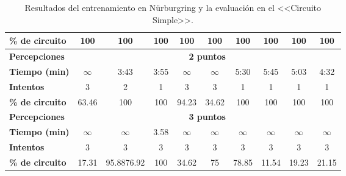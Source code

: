 \begin{table}[ht!]
\begin{tabular}{|l|c|c|c|c|c|c|c|c|c|}
\rowcolor[HTML]{32CB00} 
\cellcolor[HTML]{EFEFEF}\textbf{\% de circuito}   & 100                           & 100        & \textbf{100}                & 100                           & 100                           & 100        & 100                 & 100                & 100                \\ \hline
\rowcolor[HTML]{EFEFEF} 
\textbf{Percepciones}                     & \multicolumn{9}{c|}{\cellcolor[HTML]{EFEFEF}\textbf{2 puntos}}                                                                                                                                                        \\ \hline
\cellcolor[HTML]{EFEFEF}\textbf{Tiempo (min)}          & $\infty$                        & 3:43       & 3:55                        & $\infty$                        & $\infty$                        & 5:30       & 5:45                & 5:03               & 4:32               \\ \hline
\cellcolor[HTML]{EFEFEF}\textbf{Intentos}                  & 3                             & 2          & 1                           & 3                             & 3                             & 1          & 1                   & 1                  & 1                  \\ \hline
\rowcolor[HTML]{32CB00} 
\cellcolor[HTML]{EFEFEF}\textbf{\% de circuito}            & \cellcolor[HTML]{FFC702}63.46 & 100        & 100                         & \cellcolor[HTML]{FFC702}94.23 & \cellcolor[HTML]{FFC702}34.62 & 100        & 100                 & 100                & 100                \\ \hline
\rowcolor[HTML]{EFEFEF} 
\textbf{Percepciones}                              & \multicolumn{9}{c|}{\cellcolor[HTML]{EFEFEF}\textbf{3 puntos}}                                                                                                                                                        \\ \hline
\cellcolor[HTML]{EFEFEF}\textbf{Tiempo (min)} & $\infty$                        & $\infty$     & 3.58                        & $\infty$                        & $\infty$                        & $\infty$     & $\infty$              & $\infty$             & $\infty$             \\ \hline
\cellcolor[HTML]{EFEFEF}\textbf{Intentos}         & 3                             & 3          & 3                           & 3                             & 3                             & 3          & 3                   & 3                  & 3                  \\ \hline
\rowcolor[HTML]{FFC702} 
\cellcolor[HTML]{EFEFEF}\textbf{\% de circuito}   & 17.31                         & 95.8876.92 & \cellcolor[HTML]{32CB00}100 & 34.62                         & 75                            & 78.85      & 11.54               & 19.23              & 21.15              \\ \hline
\end{tabular}
\caption{Resultados del entrenamiento en Nürburgring y la evaluación en el <<Circuito Simple>>.}
\label{tab:entrenamiento-nurbur-evaluacion-simple}
\end{table}


